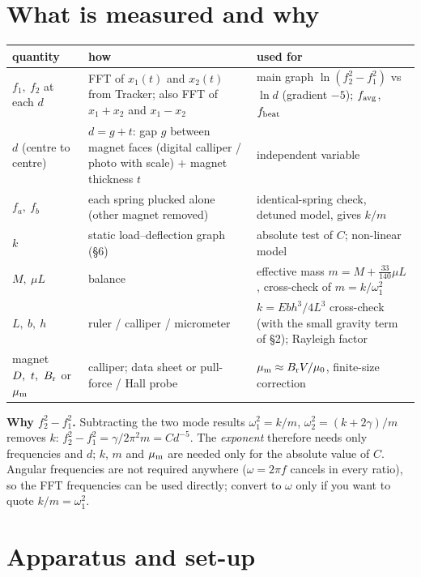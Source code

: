 \documentclass[11pt,a4paper]{article}
\begin{document}
\section{What is measured and why}

\begin{center}\small
\begin{tabular}{@{}p{3.5cm}p{4.9cm}p{7.2cm}@{}}
\toprule
quantity & how & used for\\
\midrule
$f_1,\ f_2$ at each $d$ & FFT of $x_1(t)$ and $x_2(t)$ from Tracker; also FFT of $x_1\!+\!x_2$ and $x_1\!-\!x_2$ & main graph $\ln(f_2^2-f_1^2)$ vs $\ln d$ (gradient $-5$); $f_{\rm avg}$, $f_{\rm beat}$\\
$d$ (centre to centre) & $d=g+t$: gap $g$ between magnet faces (digital calliper / photo with scale) $+$ magnet thickness $t$ & independent variable\\
$f_a,\ f_b$ & each spring plucked alone (other magnet removed) & identical-spring check, detuned model, gives $k/m$\\
$k$ & static load--deflection graph (\S6) & absolute test of $C$; non-linear model\\
$M,\ \mu L$ & balance & effective mass $m=M+\tfrac{33}{140}\mu L$, cross-check of $m=k/\omega_1^2$\\
$L,\ b,\ h$ & ruler / calliper / micrometer & $k=Ebh^3/4L^3$ cross-check (with the small gravity term of \S2); Rayleigh factor\\
magnet $D,\ t,\ B_{\rm r}$ or $\mu_{\rm m}$ & calliper; data sheet or pull-force / Hall probe & $\mu_{\rm m}\approx B_{\rm r}V/\mu_0$, finite-size correction\\
\bottomrule
\end{tabular}
\end{center}

\begin{why}
\textbf{Why $f_2^2-f_1^2$.} Subtracting the two mode results $\omega_1^2=k/m$, $\omega_2^2=(k+2\gamma)/m$ removes $k$: $f_2^2-f_1^2=\gamma/2\pi^2m=Cd^{-5}$. The \emph{exponent} therefore needs only frequencies and $d$; $k$, $m$ and $\mu_{\rm m}$ are needed only for the absolute value of $C$. Angular frequencies are not required anywhere ($\omega=2\pi f$ cancels in every ratio), so the FFT frequencies can be used directly; convert to $\omega$ only if you want to quote $k/m=\omega_1^2$.
\end{why}

\section{Apparatus and set-up}
\end{document}
